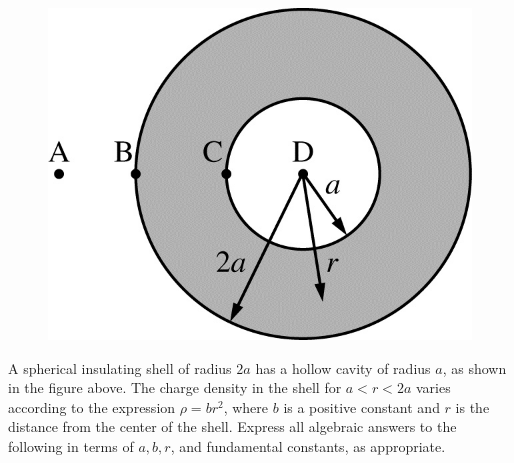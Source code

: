%
\begin{figure}[H]
\centering
\includegraphics[scale=0.3]{images/img-022-034.png}
\end{figure}


\question
A spherical insulating shell of radius $2 a$ has a hollow cavity of radius $a$, as shown in the figure above. The charge density in the shell for $a<r<2 a$ varies according to the expression $\rho=b r^{2}$, where $b$ is a positive constant and $r$ is the distance from the center of the shell. Express all algebraic answers to the following in terms of $a, b, r$, and fundamental constants, as appropriate. %

